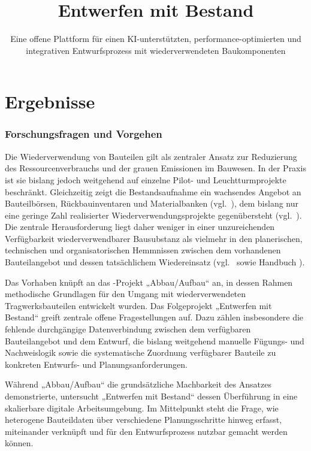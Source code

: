 \documentclass[type=zwischenbericht]{zukunftbau}
\title{Entwerfen mit Bestand}
\subtitle{Eine offene Plattform für einen KI-unterstützten, performance-optimierten und integrativen Entwurfsprozess mit wiederverwendeten Baukomponenten}
\begin{document}
\makecoverpages

\maketableofcontents

\makemainmatter

\part{Ergebnisse}
\label{teil:ergebnisse}

\section{Forschungsfragen und Vorgehen}

Die Wiederverwendung von Bauteilen gilt als zentraler Ansatz zur Reduzierung des Ressourcenverbrauchs und der grauen Emissionen im Bauwesen. In der Praxis ist sie bislang jedoch weitgehend auf einzelne Pilot- und Leuchtturmprojekte beschränkt. Gleichzeitig zeigt die Bestandsaufnahme ein wachsendes Angebot an Bauteilbörsen, Rückbauinventaren und Materialbanken (vgl.\ ), dem bislang nur eine geringe Zahl realisierter Wiederverwendungsprojekte gegenübersteht (vgl.\ ). Die zentrale Herausforderung liegt daher weniger in einer unzureichenden Verfügbarkeit wiederverwendbarer Bausubstanz als vielmehr in den planerischen, technischen und organisatorischen Hemmnissen zwischen dem vorhandenen Bauteilangebot und dessen tatsächlichem Wiedereinsatz (vgl.\  sowie Handbuch \cite{udk-abbau-aufbau-handbuch-2023}).

Das Vorhaben knüpft an das -Projekt „Abbau/Aufbau“ \cite{bbsr-abbau-aufbau-2024} an, in dessen Rahmen methodische Grundlagen für den Umgang mit wiederverwendeten Tragwerksbauteilen entwickelt wurden. Das Folgeprojekt „Entwerfen mit Bestand“ greift zentrale offene Fragestellungen auf. Dazu zählen insbesondere die fehlende durchgängige Datenverbindung zwischen dem verfügbaren Bauteilangebot und dem Entwurf, die bislang weitgehend manuelle Fügungs- und Nachweislogik sowie die systematische Zuordnung verfügbarer Bauteile zu konkreten Entwurfs- und Planungsanforderungen.

Während „Abbau/Aufbau“ die grundsätzliche Machbarkeit des Ansatzes demonstrierte, untersucht „Entwerfen mit Bestand“ dessen Überführung in eine skalierbare digitale Arbeitsumgebung. Im Mittelpunkt steht die Frage, wie heterogene Bauteildaten über verschiedene Planungsschritte hinweg erfasst, miteinander verknüpft und für den Entwurfsprozess nutzbar gemacht werden können.
\end{document}
